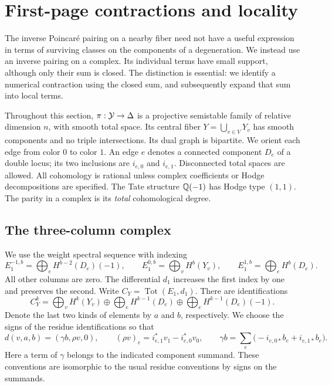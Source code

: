 \section{First-page contractions and locality}\label{fp:section}

The inverse Poincar\'e pairing on a nearby fiber need not have a useful
expression in terms of surviving classes on the components of a degeneration.
We instead use an inverse pairing on a complex.  Its individual terms have
small support, although only their sum is closed.  The distinction is essential:
we identify a numerical contraction using the closed sum, and subsequently
expand that sum into local terms.

Throughout this section, $\pi:\mathcal Y\to\Delta$ is a projective semistable family
of relative dimension $n$, with smooth total space.  Its central fiber
$Y=\bigcup_{v\in V}Y_v$ has smooth components and no triple intersections.
Its dual graph is bipartite.  We orient each edge from color $0$ to color $1$.
An edge $e$ denotes a connected component $D_e$ of a double locus; its two
inclusions are $i_{e,0}$ and $i_{e,1}$.  Disconnected total spaces are allowed.
All cohomology is rational unless complex coefficients or Hodge decompositions
are specified.  The Tate structure $\mathbb Q(-1)$ has Hodge type $(1,1)$.
The parity in a complex is its \emph{total} cohomological degree.

\subsection{The three-column complex}

We use the weight spectral sequence with indexing
\begin{equation}\label{fp:eone}
 E_1^{-1,b}=\bigoplus_e H^{b-2}(D_e)(-1),\qquad
 E_1^{0,b}=\bigoplus_v H^b(Y_v),\qquad
 E_1^{1,b}=\bigoplus_e H^b(D_e).
\end{equation}
All other columns are zero.  The differential $d_1$ increases the first index
by one and preserves the second.  Write $C_Y=\operatorname{Tot}(E_1,d_1)$.
There are identifications
\begin{equation}\label{fp:total-complex}
 C_Y^k=\bigoplus_v H^k(Y_v)
 \oplus\bigoplus_e H^{k-1}(D_e)
 \oplus\bigoplus_e H^{k-1}(D_e)(-1).
\end{equation}
Denote the last two kinds of elements by $a$ and $b$, respectively.  We choose
the signs of the residue identifications so that
\begin{equation}\label{fp:differential}
 d(v,a,b)=(\gamma b,\rho v,0),\qquad
 (\rho v)_e=i_{e,1}^*v_1-i_{e,0}^*v_0,
 \qquad
 \gamma b=\sum_e\bigl(-i_{e,0*}b_e+i_{e,1*}b_e\bigr).
\end{equation}
Here a term of $\gamma$ belongs to the indicated component summand.
These conventions are isomorphic to the usual residue conventions by signs
on the summands.

